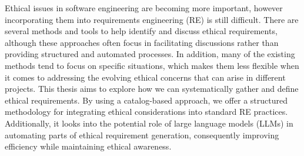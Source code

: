 
%

Ethical issues in software engineering are becoming more important, however incorporating them into requirements engineering (RE) is still 
difficult. There are several methods and tools to help identify and discuss ethical requirements, although these approaches often focus in 
facilitating discussions rather than providing structured and automated processes. In addition, many of the existing methods tend to focus on 
specific situations, which makes them less flexible when it comes to addressing the evolving ethical concerns that can arise in different projects. 
This thesis aims to explore how we can systematically gather and define ethical requirements. By using a catalog-based approach, we offer a 
structured methodology for integrating ethical considerations into standard RE practices. Additionally, it looks into the potential role of large 
language models (LLMs) in automating parts of ethical requirement generation, consequently improving efficiency while maintaining ethical awareness.


